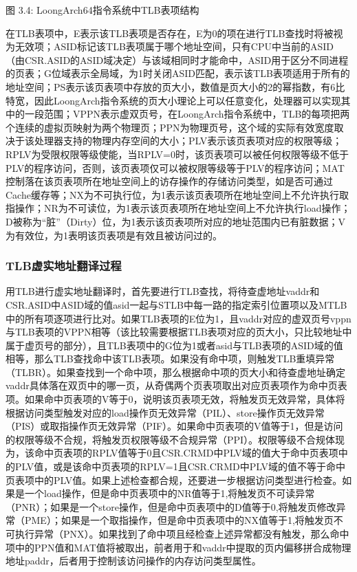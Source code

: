 \documentclass[]{ctexbook}
\begin{document}
图 3.4: LoongArch64指令系统中TLB表项结构

在TLB表项中，E表示该TLB表项是否存在，E为0的项在进行TLB查找时将被视为无效项；ASID标记该TLB表项属于哪个地址空间，只有CPU中当前的ASID（由CSR.ASID的ASID域决定）与该域相同时才能命中，ASID用于区分不同进程的页表；G位域表示全局域，为1时关闭ASID匹配，表示该TLB表项适用于所有的地址空间；PS表示该页表项中存放的页大小，数值是页大小的2的幂指数，有6比特宽，因此LoongArch指令系统的页大小理论上可以任意变化，处理器可以实现其中的一段范围；VPPN表示虚双页号，在LoongArch指令系统中，TLB的每项把两个连续的虚拟页映射为两个物理页；PPN为物理页号，这个域的实际有效宽度取决于该处理器支持的物理内存空间的大小；PLV表示该页表项对应的权限等级；RPLV为受限权限等级使能，当RPLV=0时，该页表项可以被任何权限等级不低于PLV的程序访问，否则，该页表项仅可以被权限等级等于PLV的程序访问；MAT控制落在该页表项所在地址空间上的访存操作的存储访问类型，如是否可通过Cache缓存等；NX为不可执行位，为1表示该页表项所在地址空间上不允许执行取指操作；NR为不可读位，为1表示该页表项所在地址空间上不允许执行load操作；D被称为``脏''（Dirty）位，为1表示该页表项所对应的地址范围内已有脏数据；V为有效位，为1表明该页表项是有效且被访问过的。

\hypertarget{tlbux865aux5b9eux5730ux5740ux7ffbux8bd1ux8fc7ux7a0b}{%
\subsubsection{TLB虚实地址翻译过程}\label{tlbux865aux5b9eux5730ux5740ux7ffbux8bd1ux8fc7ux7a0b}}

用TLB进行虚实地址翻译时，首先要进行TLB查找，将待查虚地址vaddr和CSR.ASID中ASID域的值asid一起与STLB中每一路的指定索引位置项以及MTLB中的所有项逐项进行比对。如果TLB表项的E位为1，且vaddr对应的虚双页号vppn与TLB表项的VPPN相等（该比较需要根据TLB表项对应的页大小，只比较地址中属于虚页号的部分），且TLB表项中的G位为1或者asid与TLB表项的ASID域的值相等，那么TLB查找命中该TLB表项。如果没有命中项，则触发TLB重填异常（TLBR）。如果查找到一个命中项，那么根据命中项的页大小和待查虚地址确定vaddr具体落在双页中的哪一页，从奇偶两个页表项取出对应页表项作为命中页表项。如果命中页表项的V等于0，说明该页表项无效，将触发页无效异常，具体将根据访问类型触发对应的load操作页无效异常（PIL）、store操作页无效异常（PIS）或取指操作页无效异常（PIF）。如果命中页表项的V值等于1，但是访问的权限等级不合规，将触发页权限等级不合规异常（PPI）。权限等级不合规体现为，该命中页表项的RPLV值等于0且CSR.CRMD中PLV域的值大于命中页表项中的PLV值，或是该命中页表项的RPLV=1且CSR.CRMD中PLV域的值不等于命中页表项中的PLV值。如果上述检查都合规，还要进一步根据访问类型进行检查。如果是一个load操作，但是命中页表项中的NR值等于1,将触发页不可读异常（PNR）；如果是一个store操作，但是命中页表项中的D值等于0,将触发页修改异常（PME）；如果是一个取指操作，但是命中页表项中的NX值等于1,将触发页不可执行异常（PNX）。如果找到了命中项且经检查上述异常都没有触发，那么命中项中的PPN值和MAT值将被取出，前者用于和vaddr中提取的页内偏移拼合成物理地址paddr，后者用于控制该访问操作的内存访问类型属性。
\end{document}

